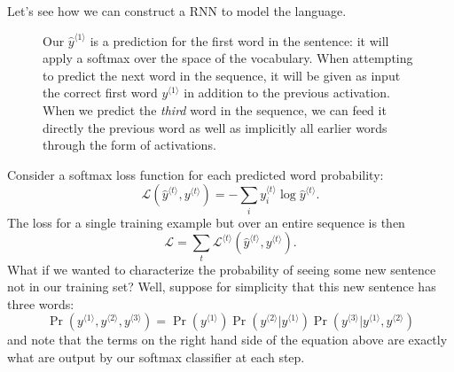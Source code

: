 \documentclass[12pt]{article}
\begin{document}
Let's see how we can construct a RNN to model the language.

\begin{figure}[h]
  \centering
  \caption{\footnotesize Our $\hat y^{\langle 1 \rangle}$ is a prediction for the first word in the sentence: it will apply a softmax over the space of the vocabulary. When attempting to predict the next word in the sequence, it will be given as input the correct first word $y^{\langle 1 \rangle}$ in addition to the previous activation. When we predict the \emph{third} word in the sequence, we can feed it directly the previous word as well as implicitly all earlier words through the form of activations.}
\end{figure}

Consider a softmax loss function for each predicted word probability:
\[
\mathcal L (\hat y^{\langle t \rangle}, y^{\langle t \rangle}) = - \sum_i y_i^{\langle t \rangle} \log \hat y^{\langle t \rangle}.
\]
The loss for a single training example but over an entire sequence is then
\[
\mathcal L = \sum_t \mathcal L^{\langle t \rangle} (\hat y^{\langle t \rangle }, y^{\langle t \rangle}).
\]
What if we wanted to characterize the probability of seeing some new sentence not in our training set? Well, suppose for simplicity that this new sentence has three words:
\[
\Pr(y^{\langle 1 \rangle}, y^{\langle 2 \rangle}, y^{\langle 3 \rangle}) = \Pr(y^{\langle 1 \rangle}) \Pr(y^{\langle 2 \rangle} | y^{\langle 1 \rangle}) \Pr(y^{\langle 3 \rangle} | y^{\langle 1 \rangle}, y^{\langle 2 \rangle})
\]
and note that the terms on the right hand side of the equation above are exactly what are output by our softmax classifier at each step.
\end{document}
